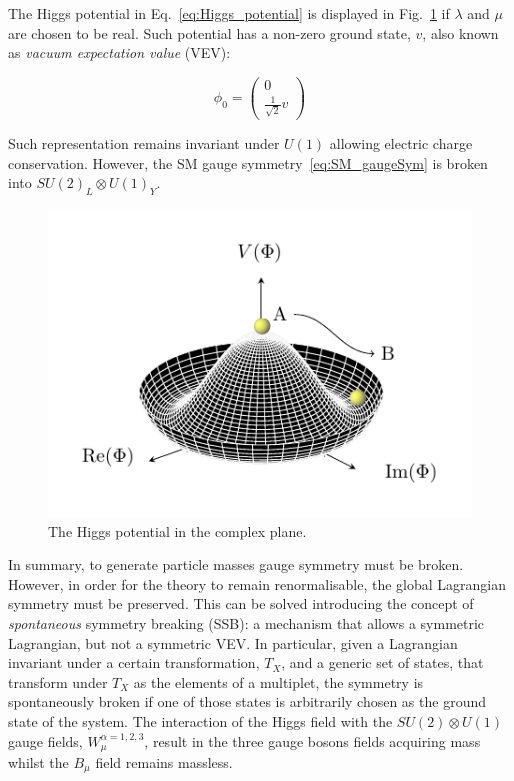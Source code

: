 			The Higgs potential in Eq.~\ref{eq:Higgs_potential} is displayed in Fig.~\ref{fig:higgs_potential} if $\lambda$ and $\mu$ are chosen to be real. Such potential has a non-zero ground state, $v$, also known as \emph{vacuum expectation value} (VEV):

			\begin{equation}
			\label{eq:Higgs_vev}
				\phi_0 = 
				\begin{pmatrix}
					0 \\ \frac{1}{\sqrt{2}} v
				\end{pmatrix}
			\end{equation}

			\noindent Such representation remains invariant under $U(1)$ allowing electric charge conservation. However, the SM gauge symmetry~\ref{eq:SM_gaugeSym} is broken into $SU(2)_L \otimes U(1)_Y$.

			\begin{figure}
			\centering
				\includegraphics[width=.5\textwidth]{HiggsPotential/HiggsPotential}
			\caption{\label{fig:higgs_potential} The Higgs potential in the complex plane.} %
			\end{figure}

			In summary, to generate particle masses gauge symmetry must be broken. However, in order for the theory to remain renormalisable, the global Lagrangian symmetry must be preserved. This can be solved introducing the concept of \emph{spontaneous} symmetry breaking (SSB): a mechanism that allows a symmetric Lagrangian, but not a symmetric VEV. In particular, given a Lagrangian invariant under a certain transformation, $T_X$, and a generic set of states, that transform under $T_X$ as the elements of a multiplet, the symmetry is spontaneously broken if one of those states is arbitrarily chosen as the ground state of the system. 
			The interaction of the Higgs field with the $SU(2) \otimes U(1)$ gauge fields, $W_\mu^{\alpha =1,2,3}$, result in the three gauge bosons fields acquiring mass whilst the $B_\mu$ field remains massless. 





